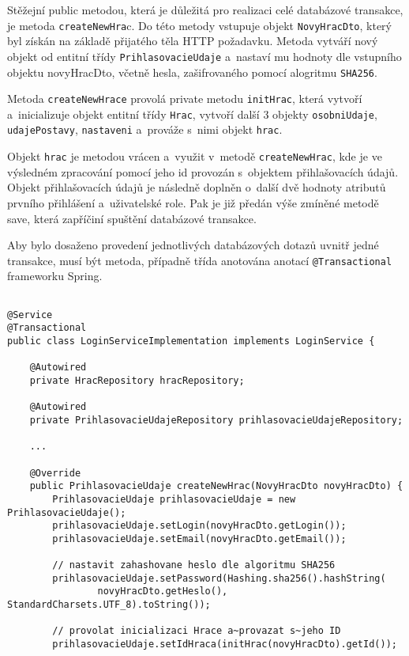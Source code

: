 \documentclass[12pt]{article}
\begin{document}
{Stěžejní public metodou, která je důležitá pro realizaci celé databázové transakce, je metoda \texttt{createNewHra}c. Do této metody vstupuje objekt \texttt{NovyHracDto}, který byl získán na základě přijatého těla HTTP požadavku. Metoda vytváří nový objekt od entitní třídy \texttt{PrihlasovacieUdaje} a~nastaví mu hodnoty dle vstupního objektu novyHracDto, včetně hesla, zašifrovaného pomocí alogritmu \texttt{SHA256}. 

Metoda \texttt{createNewHrace} provolá private metodu \texttt{initHrac}, která vytvoří a~inicializuje objekt entitní třídy \texttt{Hrac}, vytvoří další 3 objekty \texttt{osobniUdaje}, \texttt{udajePostavy}, \texttt{nastaveni} a~prováže s~nimi objekt \texttt{hrac}. 

Objekt \texttt{hrac} je metodou vrácen a~využit v~metodě \texttt{createNewHrac}, kde je ve výsledném zpracování pomocí jeho id provozán s~objektem přihlašovacích údajů. Objekt přihlašovacích údajů je následně doplněn o~další dvě hodnoty atributů prvního přihlášení a~uživatelské role. Pak je již předán výše zmíněné metodě save, která zapříčiní spuštění databázové transakce. 

Aby bylo dosaženo provedení jednotlivých databázových dotazů uvnitř jedné transakce,
musí být metoda, případně třída anotována anotací \texttt{@Transactional} frameworku Spring. 


\clearpage

\begin{lstlisting}

@Service
@Transactional
public class LoginServiceImplementation implements LoginService {
    
    @Autowired
    private HracRepository hracRepository;

    @Autowired
    private PrihlasovacieUdajeRepository prihlasovacieUdajeRepository;
    
    ...

    @Override
    public PrihlasovacieUdaje createNewHrac(NovyHracDto novyHracDto) {
        PrihlasovacieUdaje prihlasovacieUdaje = new PrihlasovacieUdaje();
        prihlasovacieUdaje.setLogin(novyHracDto.getLogin());
        prihlasovacieUdaje.setEmail(novyHracDto.getEmail());

        // nastavit zahashovane heslo dle algoritmu SHA256
        prihlasovacieUdaje.setPassword(Hashing.sha256().hashString(
                novyHracDto.getHeslo(), StandardCharsets.UTF_8).toString());

        // provolat inicializaci Hrace a~provazat s~jeho ID
        prihlasovacieUdaje.setIdHraca(initHrac(novyHracDto).getId());


\end{lstlisting}}
\end{document}
